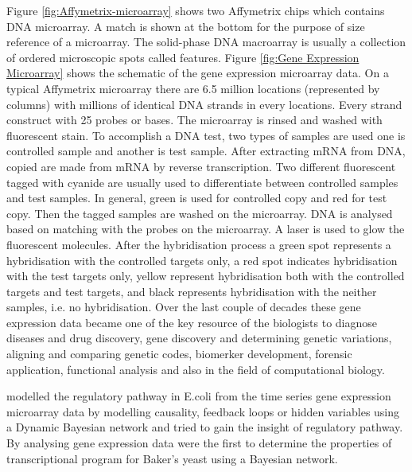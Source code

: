 Figure \ref{fig:Affymetrix-microarray} shows two Affymetrix chips which contains DNA microarray. 
A match is shown at the bottom for the purpose of size reference of a microarray.
The solid-phase DNA macroarray is usually a collection of ordered microscopic spots called features.
Figure \ref{fig:Gene Expression Microarray} shows the schematic of the gene expression microarray data. 
On a typical Affymetrix microarray there are 6.5 million locations (represented by columns) with 
millions of identical DNA strands in every locations. Every strand construct with 25 probes or bases. 
The microarray is rinsed and washed with fluorescent stain. To accomplish a DNA test, two types of
samples are used one is controlled sample and another is test sample. 
After extracting mRNA from DNA, copied are made from mRNA by reverse transcription. 
Two different fluorescent tagged with cyanide are usually used to differentiate between controlled 
samples and test samples. In general, green is used for controlled copy and red for test copy. 
Then the tagged samples are washed on the microarray. 
DNA is analysed based on matching with the probes on the microarray.
A laser is used to glow the fluorescent molecules. After the hybridisation process
a green spot represents a hybridisation with the controlled targets only, a red spot indicates 
hybridisation with the test targets only, yellow represent hybridisation both with the controlled 
targets and test targets, and black represents hybridisation with the neither samples, i.e. 
no hybridisation. Over the last couple of decades these gene expression data became one of the key 
resource of the biologists to diagnose diseases and drug discovery, gene discovery and determining 
genetic variations, aligning and comparing genetic codes, biomerker development, forensic application, 
functional analysis and also in the field of computational biology.

\cite{Ong:2002} modelled the regulatory pathway in E.coli
from the time series gene expression microarray data by modelling causality, feedback loops or 
hidden variables using a Dynamic Bayesian network and tried to gain the insight of regulatory pathway.
By analysing gene expression data \cite{Friedman:2000} were the first to determine the properties 
of transcriptional program for Baker's yeast using a Bayesian network.

